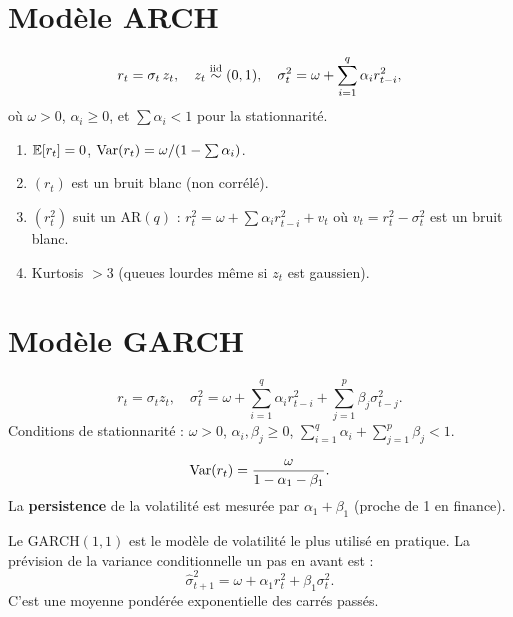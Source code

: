 \section{Mod\`ele ARCH}

\begin{definition}[ARCH$(q)$]
\[
r_t = \sigma_t\,z_t, \quad z_t\stackrel{\mathrm{iid}}{\sim}(0,1), \quad \sigma_t^2 = \omega + \sum_{i=1}^q\alpha_i r_{t-i}^2,
\]
o\`u $\omega>0$, $\alpha_i\geq 0$, et $\sum\alpha_i<1$ pour la stationnarit\'e.
\end{definition}

\begin{theoreme}
\begin{enumerate}
\item $\mathbb{E}[r_t]=0$, $\operatorname{Var}(r_t)=\omega/(1-\sum\alpha_i)$.
\item $(r_t)$ est un bruit blanc (non corr\'el\'e).
\item $(r_t^2)$ suit un AR$(q)$ : $r_t^2 = \omega+\sum\alpha_i r_{t-i}^2+v_t$ o\`u $v_t=r_t^2-\sigma_t^2$ est un bruit blanc.
\item Kurtosis $>3$ (queues lourdes m\^eme si $z_t$ est gaussien).
\end{enumerate}
\end{theoreme}

\section{Mod\`ele GARCH}

\begin{definition}[GARCH$(p,q)$]
\[
r_t = \sigma_t z_t, \quad \sigma_t^2 = \omega + \sum_{i=1}^q\alpha_i r_{t-i}^2 + \sum_{j=1}^p\beta_j\sigma_{t-j}^2.
\]
Conditions de stationnarit\'e : $\omega>0$, $\alpha_i,\beta_j\geq 0$, $\sum_{i=1}^q\alpha_i+\sum_{j=1}^p\beta_j<1$.
\end{definition}

\begin{theoreme}
\[
\operatorname{Var}(r_t) = \frac{\omega}{1-\alpha_1-\beta_1}.
\]
La \textbf{persistence} de la volatilit\'e est mesur\'ee par $\alpha_1+\beta_1$ (proche de 1 en finance).
\end{theoreme}

\begin{intuition}
Le GARCH$(1,1)$ est le mod\`ele de volatilit\'e le plus utilis\'e en pratique. La pr\'evision de la variance conditionnelle un pas en avant est :
\[
\hat{\sigma}_{t+1}^2 = \omega + \alpha_1 r_t^2 + \beta_1\sigma_t^2.
\]
C'est une moyenne pond\'er\'ee exponentielle des carr\'es pass\'es.
\end{intuition}

